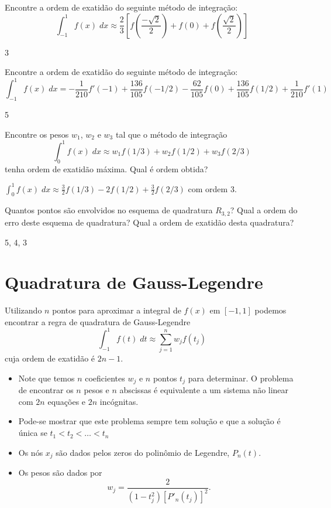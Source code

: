 \begin{exer}
Encontre a ordem de exatidão do seguinte método de integração:
$$\int_{-1}^1f(x)\;dx\approx \frac{2}{3}\left[f\left(\frac{-\sqrt{2}}{2}\right)+f(0)+f\left(\frac{\sqrt{2}}{2}\right)\right]$$
\end{exer}
\begin{resp}  
3    
\end{resp}


\begin{exer}
Encontre a ordem de exatidão do seguinte método de integração:
$$\int_{-1}^1f(x)\;dx=-\frac{1}{210}f'(-1)+\frac{136}{105} f(-1/2) - \frac{62}{105} f(0) + \frac{136}{105}f(1/2) +\frac{1}{210}f'(1)$$
\end{exer}
\begin{resp}
5
\end{resp}

\begin{exer} Encontre os pesos $w_1$, $w_2$ e $w_3$ tal que o método de integração
$$\int_0^1 f(x)\;dx \approx w_1 f(1/3)  + w_2f(1/2) + w_3f(2/3)$$
tenha ordem de exatidão máxima. Qual é ordem obtida?
\end{exer}
\begin{resp}
$\int_0^1 f(x)\;dx \approx \frac{3}{2} f(1/3)  -2f(1/2) + \frac{3}{2}f(2/3)$ com ordem 3.
\end{resp}

\begin{exer}
Quantos pontos são envolvidos no esquema de quadratura $R_{3,2}$? Qual a ordem do erro deste esquema de quadratura? Qual a ordem de exatidão desta quadratura?
\end{exer}
\begin{resp}
 5, 4, 3
\end{resp}


\section{Quadratura de Gauss-Legendre}

Utilizando $n$ pontos para aproximar a integral de $f(x)$ em $[-1,1]$ podemos encontrar a regra de quadratura de Gauss-Legendre
$$\int_{-1}^1 f(t)\;dt \approx \sum_{j=1}^n w_j f(t_j)$$
cuja ordem de exatidão é $2n-1$.

\begin{itemize}
\item Note que temos $n$ coeficientes $w_j$ e $n$ pontos $t_j$ para determinar. O problema de encontrar os $n$ pesos e $n$ abscissas é equivalente a um sistema não linear com $2n$ equações e $2n$ incógnitas.
\item Pode-se mostrar que este problema sempre tem solução e que a solução é única se $t_1<t_2<\ldots <t_n$
\item Os nós $x_j$ são dados pelos zeros do polinômio de Legendre, $P_n(t)$.
\item Os pesos são dados por
$$w_j = \frac{2}{\left( 1-t_j^2 \right) [P'_n(t_j)]^2}.$$
\end{itemize}

